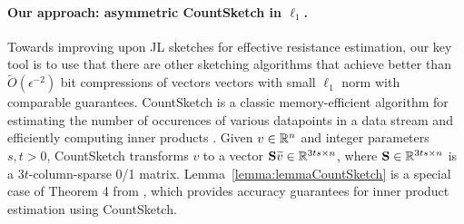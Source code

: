 \paragraph{Our approach: asymmetric CountSketch in $\ell_1$.} {Towards improving upon JL sketches for effective resistance estimation, our key tool is to use that there are other sketching algorithms that achieve better than $\widetilde{O}(\epsilon^{-2})$ bit compressions of vectors vectors with small $\ell_1$ norm with comparable guarantees. CountSketch is a classic memory-efficient algorithm for estimating the number of occurences of various datapoints in a data stream \cite{CHARIKAR20043} and efficiently computing inner products \cite{LPT2012}. Given $v \in \mathbb{R}^n$ and integer parameters $s, t > 0$, CountSketch transforms $v$ to a vector $\mathbf{S} \widetilde{v} \in \mathbb{R}^{3ts \times n}$, where $\mathbf{S} \in \mathbb{R}^{3ts \times n}$ is a $3t$-column-sparse 0/1 matrix. Lemma~\ref{lemma:lemmaCountSketch} is a special case of Theorem 4 from \cite{LPT2012}, which provides accuracy guarantees for inner product estimation using CountSketch. }

